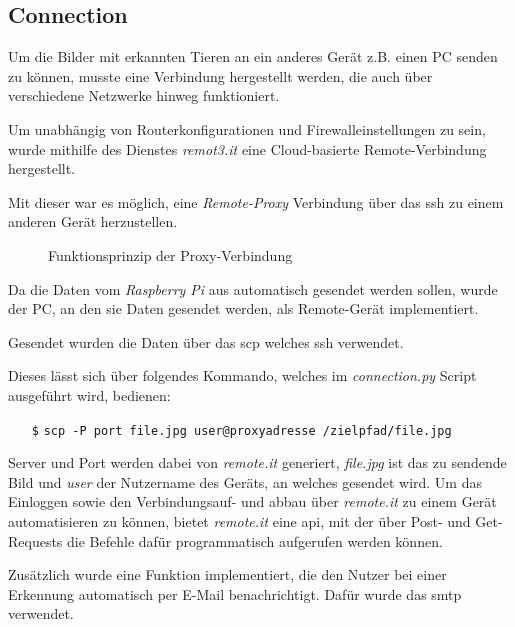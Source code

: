 \subsection*{Connection}

Um die Bilder mit erkannten Tieren an ein anderes Gerät 
z.B. einen PC senden zu können, musste eine Verbindung
hergestellt werden, die auch über verschiedene Netzwerke 
hinweg funktioniert.

Um unabhängig von Routerkonfigurationen und 
Firewalleinstellungen zu sein, wurde mithilfe des
Dienstes \textit{remot3.it} \cite{remot3}
eine Cloud-basierte Remote-Verbindung hergestellt.

Mit dieser war es möglich, eine \textit{Remote-Proxy} 
Verbindung über das \Gls{ssh} zu einem anderen Gerät 
herzustellen.
\vspace{1cm}

\begin{figure}[H]
    \centering
    \def\svgwidth{0.7\textwidth}
    
    \caption{Funktionsprinzip der Proxy-Verbindung}
    \label{fig:remoteit}
\end{figure}
\vspace{1cm}

Da die Daten vom \textit{Raspberry Pi} aus
 automatisch gesendet werden sollen, wurde der PC, an den 
sie Daten gesendet werden, als Remote-Gerät implementiert.

Gesendet wurden die Daten über das \Gls{scp}
welches \Gls{ssh} verwendet.

Dieses lässt sich über folgendes Kommando,
welches im \textit{connection.py}
Script ausgeführt wird, bedienen:
\begin{itemize}
    \item[\texttt{\$}] \texttt{scp -P port file.jpg 
    user@proxyadresse /zielpfad/file.jpg}
\end{itemize}

Server und Port werden dabei von \textit{remote.it}
generiert, \textit{file.jpg} ist das zu sendende Bild und
\textit{user} der Nutzername des Geräts,
an welches gesendet wird.
Um das Einloggen sowie den Verbindungsauf- und abbau 
über \textit{remote.it} zu einem Gerät automatisieren zu können,
bietet \textit{remote.it} eine \Gls{api}, mit der
über Post- und Get-Requests die Befehle dafür
programmatisch aufgerufen werden können.


Zusätzlich wurde eine Funktion implementiert,
die den Nutzer bei einer Erkennung automatisch 
per E-Mail benachrichtigt. Dafür wurde das
\Gls{smtp} verwendet.
